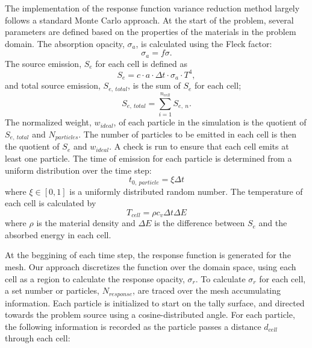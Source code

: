 \documentclass[]{article}
\begin{document}
	The implementation of the response function variance reduction method largely follows a standard Monte Carlo approach. At the start of the problem, several parameters are defined based on the properties of the materials in the problem domain. The absorption opacity, $\sigma_{a}$, is calculated using the Fleck factor:
	\begin{equation}
	\sigma_{a} = f \sigma.
	\end{equation}The source emission, $S_{e}$ for each cell is defined as
	\begin{equation}
		S_{e} = c \cdot a \cdot \Delta t \cdot \sigma_{a}  \cdot T^{4},
	\end{equation}
	and total source emission, $S_{e,~total}$, is the sum of $S_{e}$ for each cell;
	\begin{equation}
		S_{e,~total} = \sum_{i = 1}^{n_{cell}} S_{e,~n}.
	\end{equation}
	The normalized weight, $w_{ideal}$, of each particle in the simulation is the quotient of $S_{e,~total}$ and $N_{particles}$. The number of particles to be emitted in each cell is then the quotient of $S_{e}$ and $w_{ideal}$. A check is run to ensure that each cell emits at least one particle. The time of emission for each particle is determined from a uniform distribution over the time step:
	\begin{equation}
		t_{0,~particle} = \xi \Delta t
	\end{equation}
	where $\xi \in [0,1]$ is a uniformly distributed random number. The temperature of each cell is calculated by
	\begin{equation} \label{Eq: cell_T}
		T_{cell} = \rho c_{v} \Delta t \Delta E
	\end{equation}
	where $\rho$ is the material density and $\Delta E$ is the difference between $S_{e}$ and the absorbed energy in each cell.

At the beggining of each time step, the response function is generated for the mesh. Our approach discretizes the function over the domain space, using each cell as a region to calculate the response opacity, $\sigma_{r}$. To calculate $\sigma_{r}$ for each cell, a set number or particles, $N_{response}$, are traced over the mesh accumulating information. Each particle is initialized to start on the tally surface, and directed towards the problem source using a cosine-distributed angle. For each particle, the following information is recorded as the particle passes a distance $d_{cell}$ through each cell:
\end{document}
